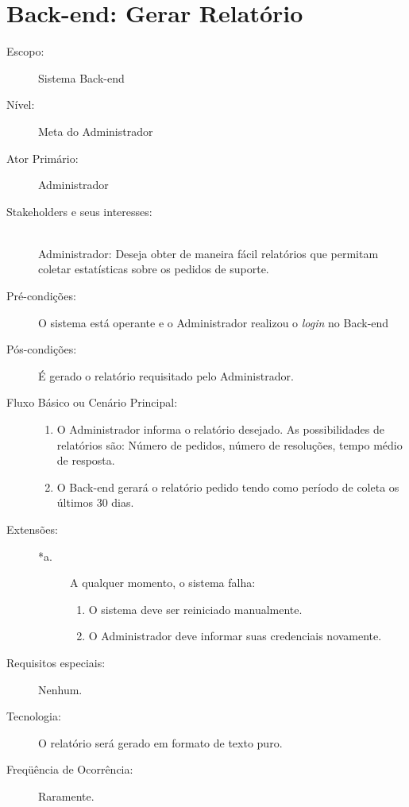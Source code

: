 \documentclass[brazil,times]{abnt}
\begin{document}
\section{Back-end: Gerar Relatório}
\begin{description}
\item[Escopo:] Sistema Back-end
\item[Nível:] Meta do Administrador
\item[Ator Primário:] Administrador
\item[Stakeholders e seus interesses:] \hfill \\
Administrador: Deseja obter de maneira fácil relatórios que permitam coletar
estatísticas sobre os pedidos de suporte.

\item[Pré-condições:] O sistema está operante e o Administrador realizou o \emph{login}
no Back-end
\item[Pós-condições:]  É gerado o relatório requisitado pelo Administrador.
\item[Fluxo Básico ou Cenário Principal:]\hfill
\begin{enumerate}
  \item O Administrador informa o relatório desejado. As possibilidades de
  relatórios são: Número de pedidos, número de resoluções, tempo médio de
  resposta.
  \item O Back-end gerará o relatório pedido tendo como período de coleta os
  últimos 30 dias.
\end{enumerate}

\item[Extensões:]\hfill
\begin{description}
	\item[*a.] A qualquer momento, o sistema falha: \hfill
	\begin{enumerate}
 		\item O sistema deve ser reiniciado manualmente.
 		\item O Administrador deve informar suas credenciais novamente.
	\end{enumerate} 
\end{description}
\item[Requisitos especiais:] Nenhum.
\item[Tecnologia:] O relatório será gerado em formato de texto puro.
\item[Freqüência de Ocorrência:] Raramente.

\end{description}
\end{document}
